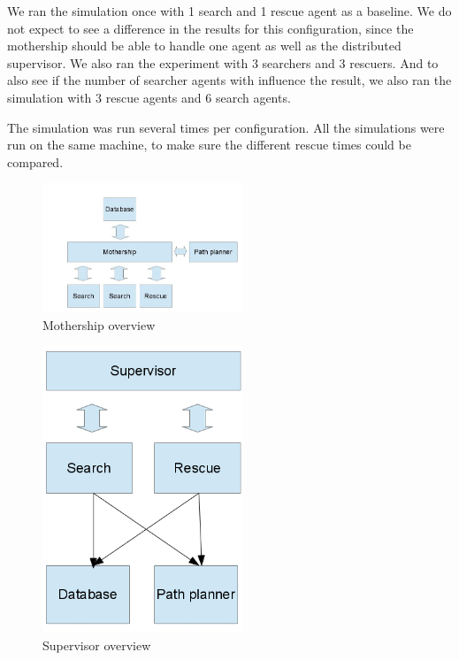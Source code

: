 We ran the simulation once with 1 search and 1 rescue agent as a baseline.
We do not expect to see a difference in the results for this configuration,
since the mothership should be able to handle one agent as well as the
distributed supervisor. We also ran the experiment with 3 searchers and 3
rescuers. And to also see if the number of searcher agents with influence
the result, we also ran the simulation with 3 rescue agents and 6 search
agents. 

The simulation was run several times per configuration. All the simulations
were run on the same machine, to make sure the different rescue times could
be compared. 

\begin{figure}[h]
	\centering
		\includegraphics[width=6cm]{mothership}
	\caption{Mothership overview}
	\label{fig:mothership}
\end{figure}

\begin{figure}[h]
	\centering
		\includegraphics[width=6cm]{supervisor}
	\caption{Supervisor overview}
	\label{fig:supervisor}
\end{figure}

